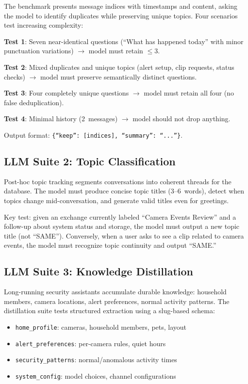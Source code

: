 \documentclass[onecolumn,10pt]{IEEEtran}
\begin{document}
The benchmark presents message indices with timestamps and content, asking
the model to identify duplicates while preserving unique topics. Four
scenarios test increasing complexity:

\noindent\textbf{Test 1}: Seven near-identical questions
(``What has happened today'' with minor punctuation
variations) $\rightarrow$ model must retain $\leq$3.

\noindent\textbf{Test 2}: Mixed duplicates and unique topics
(alert setup, clip requests, status checks) $\rightarrow$ model must
preserve semantically distinct questions.

\noindent\textbf{Test 3}: Four completely unique questions $\rightarrow$
model must retain all four (no false deduplication).

\noindent\textbf{Test 4}: Minimal history (2~messages)
$\rightarrow$ model should not drop anything.

Output format: \texttt{\{``keep'': [indices], ``summary'': ``...''\}}.

\subsection{LLM Suite 2: Topic Classification}

Post-hoc topic tracking segments conversations into coherent threads
for the database. The model must produce concise topic titles
(3--6~words), detect when topics change mid-conversation, and generate
valid titles even for greetings.

Key test: given an exchange currently labeled ``Camera Events Review''
and a follow-up about system status and storage, the model must
output a new topic title (not ``SAME''). Conversely, when a user
asks to see a clip related to camera events, the model must
recognize topic continuity and output ``SAME.''

\subsection{LLM Suite 3: Knowledge Distillation}

Long-running security assistants accumulate durable knowledge:
household members, camera locations, alert preferences, normal
activity patterns. The distillation suite tests structured extraction
using a slug-based schema:

\begin{itemize}[nosep]
    \item \texttt{home\_profile}: cameras, household members, pets, layout
    \item \texttt{alert\_preferences}: per-camera rules, quiet hours
    \item \texttt{security\_patterns}: normal/anomalous activity times
    \item \texttt{system\_config}: model choices, channel configurations
\end{itemize}
\end{document}
